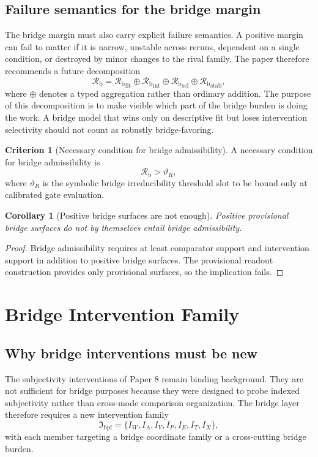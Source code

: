 \documentclass[11pt,a4paper]{article}
\newtheorem{corollary}[theorem]{Corollary}
\theoremstyle{definition}
\newtheorem{criterion}[theorem]{Criterion}
\newcommand{\BridgeIntervFam}{\mathfrak{I}_{\mathrm{bpf}}}
\newcommand{\BridgeMargin}{\mathcal{R}_{\mathrm{b}}}
\begin{document}
\subsection{Failure semantics for the bridge margin}
The bridge margin must also carry explicit failure semantics. A positive margin can fail to matter if it is narrow, unstable across reruns, dependent on a single condition, or destroyed by minor changes to the rival family. The paper therefore recommends a future decomposition
\[
\BridgeMargin=
{\BridgeMargin}_{\mathrm{fit}}
\oplus
{\BridgeMargin}_{\mathrm{int}}
\oplus
{\BridgeMargin}_{\mathrm{sel}}
\oplus
{\BridgeMargin}_{\mathrm{stab}},
\]
where $\oplus$ denotes a typed aggregation rather than ordinary addition. The purpose of this decomposition is to make visible which part of the bridge burden is doing the work. A bridge model that wins only on descriptive fit but loses intervention selectivity should not count as robustly bridge-favoring.

\begin{criterion}[Necessary condition for bridge admissibility]
A necessary condition for bridge admissibility is
\[
\BridgeMargin > \vartheta_R,
\]
where $\vartheta_R$ is the symbolic bridge irreducibility threshold slot to be bound only at calibrated gate evaluation.
\end{criterion}

\begin{corollary}[Positive bridge surfaces are not enough]
Positive provisional bridge surfaces do not by themselves entail bridge admissibility.
\end{corollary}

\begin{proof}
Bridge admissibility requires at least comparator support and intervention support in addition to positive bridge surfaces. The provisional readout construction provides only provisional surfaces, so the implication fails.
\end{proof}

\section{Bridge Intervention Family}
\subsection{Why bridge interventions must be new}
The subjectivity interventions of Paper 8 remain binding background. They are not sufficient for bridge purposes because they were designed to probe indexed subjectivity rather than cross-mode comparison organization. The bridge layer therefore requires a new intervention family
\[
\BridgeIntervFam=
\{I_W,I_A,I_V,I_P,I_E,I_T,I_X\},
\]
with each member targeting a bridge coordinate family or a cross-cutting bridge burden.
\end{document}
